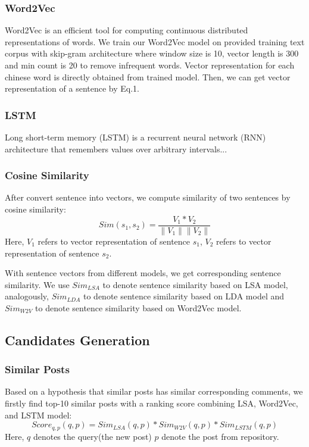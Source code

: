 \documentclass{llncs}
\begin{document}
\subsubsection{Word2Vec}
Word2Vec is an efficient tool for computing continuous distributed 
representations of words\cite{Mikolov}. We train our Word2Vec model on provided training 
text corpus with skip-gram architecture where window size is 10, vector 
length is 300 and min count is 20 to remove infrequent words. Vector 
representation for each chinese word is directly obtained from trained model. 
Then, we can get vector representation of a sentence by Eq.1.

\subsubsection{LSTM}
Long short-term memory (LSTM) is a recurrent neural network (RNN) architecture that remembers values over arbitrary intervals...

\subsubsection{Cosine Similarity} 
After convert sentence into vectors, we compute similarity of two sentences by cosine similarity:
\begin{equation}
   Sim(s_1, s_2) = \frac{V_1 * V_2}{\left \| V_1 \right \| \left \| V_2 \right \|}
\end{equation}
Here, $V_1$ refers to vector representation of sentence $s_1$, $V_2$ refers to vector representation of sentence $s_2$.

With sentence vectors from different models, we get corresponding sentence similarity. We use $Sim_{LSA}$ to denote sentence similarity based on LSA model, analogously, $Sim_{LDA}$ to denote sentence similarity based on LDA model and $Sim_{W2V}$ to denote sentence similarity based on Word2Vec model.

\subsection{Candidates Generation}

\subsubsection{Similar Posts}
Based on a hypothesis that similar posts has similar corresponding comments, we firstly find top-10 similar posts with a ranking score combining LSA, Word2Vec, and LSTM model:
\begin{equation}
   Score_{q,p}(q, p) = Sim_{LSA}(q, p) * Sim_{W2V}(q, p) * Sim_{LSTM}(q, p)
\end{equation}
Here, $q$ denotes the query(the new post) $p$ denote the post from repository.
\end{document}
